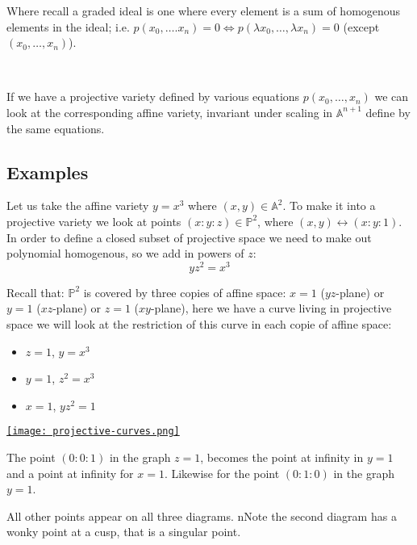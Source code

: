 Where recall a graded ideal is one where every element is a sum of homogenous elements in the ideal; i.e. $p(x_0,\dots.x_n) = 0\iff p(\lambda x_0,\dots,\lambda x_n) = 0$ (except $(x_0,\dots,x_n)$).

\

If we have a projective variety defined by various equations $p(x_0,\dots,x_n)$ we can look at the corresponding affine variety, invariant under scaling in $\mathbb{A}^{n+1}$ define by the same equations.


\subsection{Examples}

\begin{example}
    Let us take the affine variety $y=x^3$ where $(x,y)\in \mathbb{A}^2$. To make it into a projective variety we look at points $(x:y:z)\in \mathbb{P}^2$, where $(x,y)\leftrightarrow (x:y:1)$. In order to define a closed subset of projective space we need to make out polynomial homogenous, so we add in powers of $z$:\[yz^2 = x^3\]

  Recall that: $\mathbb{P}^2$ is covered by three copies of affine space: $x = 1$ ($yz$-plane) or $y = 1$ ($xz$-plane) or $z = 1$ ($xy$-plane), here we have a curve living in projective space we will look at the restriction of this curve in each copie of affine space:\begin{itemize}
    \item $z = 1$, $y=x^3$
    \item $y=1$, $z^2 = x^3$
    \item $x=1$, $yz^2 = 1$
  \end{itemize}

  \href{https://youtu.be/-znTMw_3mu0?t=797}{\texttt{[image: projective-curves.png]}}


  The point $(0\colon 0\colon 1)$ in the graph $z=1$, becomes the point at infinity in $y=1$ and a point at infinity for $x=1$. Likewise for the point $(0\colon 1\colon 0)$ in the graph $y=1$.

  All other points appear on all three diagrams. nNote the second diagram has a wonky point at a cusp, that is a singular point.
\end{example}

